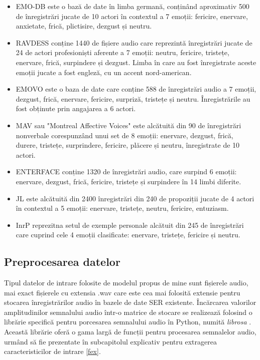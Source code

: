 \documentclass[a4paper,12pt]{book}
\begin{document}
					\begin{itemize}
						\item EMO-DB \cite{emodb} este o bază de date în limba germană, conținând aproximativ 500 de înregistrări jucate de 10 actori în contextul a 7 emoții: fericire, enervare, anxietate, frică, plictisire, dezgust și neutru. 
						
						\item RAVDESS \cite{ravdess} conține 1440 de fișiere audio care reprezintă înregistrări jucate de 24 de actori profesioniști aferente a 7 emoții: neutru, fericire, tristețe, enervare, frică, surpindere și dezgust. Limba în care au fost înregistrate aceste emoții jucate a fost engleză, cu un accent nord-american.
						
						
						\item EMOVO \cite{emovo} este o baza de date care conține 588 de înregistrări audio a 7 emoții, dezgust, frică, enervare, fericire, surpriză, tristețe și neutru. Înregistrările au fost obținute prin angajarea a 6 actori.
						
						\item MAV \cite{mav} sau "Montreal Affective Voices" este alcătuită din 90 de înregistrări nonverbale corespunzând unui set de 8 emoții: enervare, dezgust, frică, durere, tristețe, surprindere, fericire, plăcere și neutru, înregistrate de 10 actori.
						
						\item ENTERFACE \cite{enterface} conține 1320 de înregistrări audio, care surpind 6 emoții: enervare, dezgust, frică, fericire, tristețe și surpindere în 14 limbi diferite.
						
						\item JL \cite{JL} este alcătuită din 2400 înregistrări din 240 de propoziții jucate de 4 actori în contextul a 5 emoții: enervare, tristețe, neutru, fericire, entuziasm.
						
						\item InrP reprezitna setul de exemple personale alcătuit din 245 de înregistrări care cuprind cele 4 emoții clasificate: enervare, tristețe, fericire și neutru.							
					\end{itemize}
				
				\subsection{Preprocesarea datelor} \label{prepo}
					Tipul datelor de intrare folosite de modelul propus de mine sunt fișierele audio, mai exact fișierele cu extensia .wav care este cea mai folosită extensie pentru stocarea înregistrărilor audio în bazele de date SER existente. Încărcarea valorilor amplitudinilor semnalului audio într-o matrice de stocare se realizează folosind o librărie specifică pentru porcesarea semnalului audio în Python, numită \textit{librosa} \cite{librosa}. Această librărie oferă o gama largă de funcții pentru procesarea semnalelor audio,  urmând să fie prezentate în subcapitolul explicativ pentru extragerea caracteristicilor de intrare \ref{fex}.
					
\end{document}
